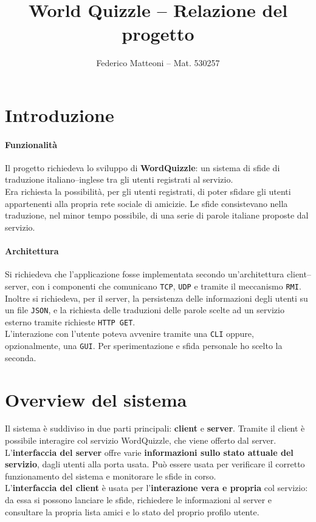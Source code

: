 \documentclass[10pt]{article}
\begin{document}
{\selectfont
\title{World Quizzle -- Relazione del progetto}
\author{Federico Matteoni -- Mat. 530257}
\date{ }
\renewcommand*\contentsname{Indice}

\maketitle
\section{Introduzione}
\paragraph{Funzionalità} Il progetto richiedeva lo sviluppo di \textbf{WordQuizzle}: un sistema di sfide di traduzione italiano--inglese tra gli utenti registrati al servizio.\\
Era richiesta la possibilità, per gli utenti registrati, di poter sfidare gli utenti appartenenti alla propria rete sociale di amicizie. Le sfide consistevano nella traduzione, nel minor tempo possibile, di una serie di parole italiane proposte dal servizio.
\paragraph{Architettura} Si richiedeva che l'applicazione fosse implementata secondo un'architettura client--server, con i componenti che comunicano \texttt{TCP}, \texttt{UDP} e tramite il meccanismo \texttt{RMI}. Inoltre si richiedeva, per il server, la persistenza delle informazioni degli utenti su un file \texttt{JSON}, e la richiesta delle traduzioni delle parole scelte ad un servizio esterno tramite richieste \texttt{HTTP GET}.\\
L'interazione con l'utente poteva avvenire tramite una \texttt{CLI} oppure, opzionalmente, una \texttt{GUI}. Per sperimentazione e sfida personale ho scelto la seconda.
\section{Overview del sistema}
Il sistema è suddiviso in due parti principali: \textbf{client} e \textbf{server}. Tramite il client è possibile interagire col servizio WordQuizzle, che viene offerto dal server.\\
L'\textbf{interfaccia del server} offre varie \textbf{informazioni sullo stato attuale del servizio}, dagli utenti alla porta usata. Può essere usata per verificare il corretto funzionamento del sistema e monitorare le sfide in corso.\\
L'\textbf{interfaccia del client} è usata per l'\textbf{interazione vera e propria} col servizio: da essa si possono lanciare le sfide, richiedere le informazioni al server e consultare la propria lista amici e lo stato del proprio profilo utente.
}
\end{document}
